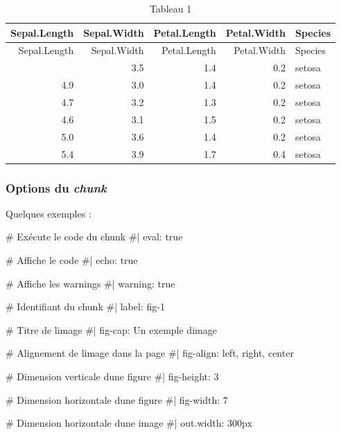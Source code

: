 \documentclass[
  french,
  11pt,
  a4paper,
]{article}
\newenvironment{Shaded}{}{}
\newcommand{\CommentTok}[1]{\textcolor[rgb]{0.42,0.45,0.49}{#1}}
\begin{document}
\begin{longtable}[]{@{}rrrrl@{}}
\caption{Tableau 1}\tabularnewline
\toprule\noalign{}
Sepal.Length & Sepal.Width & Petal.Length & Petal.Width & Species \\
\midrule\noalign{}
\endfirsthead
\toprule\noalign{}
Sepal.Length & Sepal.Width & Petal.Length & Petal.Width & Species \\
\midrule\noalign{}
\endhead
\bottomrule\noalign{}
\endlastfoot
5.1 & 3.5 & 1.4 & 0.2 & setosa \\
4.9 & 3.0 & 1.4 & 0.2 & setosa \\
4.7 & 3.2 & 1.3 & 0.2 & setosa \\
4.6 & 3.1 & 1.5 & 0.2 & setosa \\
5.0 & 3.6 & 1.4 & 0.2 & setosa \\
5.4 & 3.9 & 1.7 & 0.4 & setosa \\
\end{longtable}

\subsubsection{\texorpdfstring{Options du
\emph{chunk}}{Options du chunk}}\label{options-du-chunk}

Quelques exemples :

\begin{Shaded}
\begin{Highlighting}[]
\CommentTok{\# Exécute le code du chunk}
\CommentTok{\#| eval: true}

\CommentTok{\# Affiche le code}
\CommentTok{\#| echo: true}

\CommentTok{\# Affiche les warnings}
\CommentTok{\#| warning: true}

\CommentTok{\# Identifiant du chunk}
\CommentTok{\#| label: fig{-}1}

\CommentTok{\# Titre de l\textquotesingle{}image}
\CommentTok{\#| fig{-}cap: Un exemple d\textquotesingle{}image}

\CommentTok{\# Alignement de l\textquotesingle{}image dans la page}
\CommentTok{\#| fig{-}align: left, right, center}

\CommentTok{\# Dimension verticale d\textquotesingle{}une figure}
\CommentTok{\#| fig{-}height: 3}

\CommentTok{\# Dimension horizontale d\textquotesingle{}une figure}
\CommentTok{\#| fig{-}width: 7}

\CommentTok{\# Dimension horizontale d\textquotesingle{}une image}
\CommentTok{\#| out.width: 300px}
\end{Highlighting}
\end{Shaded}
\end{document}
